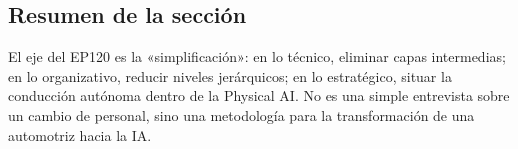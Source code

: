 \subsection{Resumen de la sección}

El eje del EP120 es la «simplificación»: en lo técnico, eliminar capas intermedias; en lo organizativo, reducir niveles jerárquicos; en lo estratégico, situar la conducción autónoma dentro de la Physical AI. No es una simple entrevista sobre un cambio de personal, sino una metodología para la transformación de una automotriz hacia la IA.
